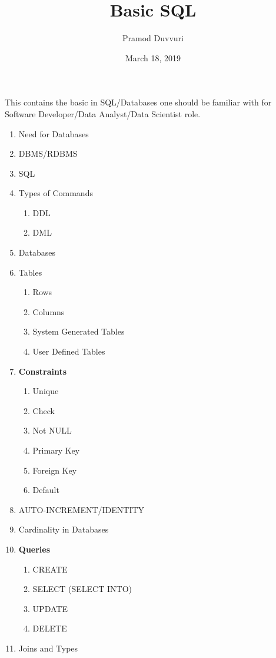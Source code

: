 \documentclass[11pt]{article}
\title{Basic SQL}
\author{Pramod Duvvuri}
\date{March 18, 2019}
\begin{document}
	\maketitle
	This contains the basic in SQL/Databases one should be familiar with for Software Developer/Data Analyst/Data Scientist role. 
	\begin{enumerate}
	\item Need for Databases
	\item DBMS/RDBMS
	\item SQL
	\item Types of Commands
	\begin{enumerate}
		\item DDL
		\item DML
	\end{enumerate}	
    \item Databases 
     \item Tables
     \begin{enumerate}
     	\item Rows
     	\item Columns
     	\item System Generated Tables
     	\item User Defined Tables
     \end{enumerate} 
    \item \textbf{Constraints}
    \begin{enumerate}
    	\item Unique
    	\item Check
    	\item Not NULL
    	\item Primary Key
    	\item Foreign Key
    	\item Default
    \end{enumerate}
    \item AUTO-INCREMENT/IDENTITY
    \item Cardinality in Databases
    \item \textbf{Queries}
    \begin{enumerate}
    	\item CREATE
    	\item SELECT (SELECT INTO)
    	\item UPDATE
    	\item DELETE
    \end{enumerate}
   \item Joins and Types

\end{enumerate}
\end{document}
